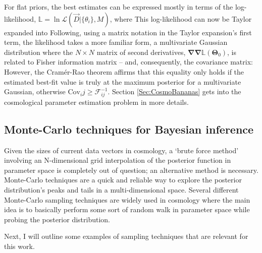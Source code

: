 \qquad For flat priors, the best estimates can be expressed mostly in terms of the log-likelihood, $\mathbb{L} = \ln \mathcal{L}(\vec{D}|\{\theta_i\},M)$, where 
This log-likelihood can now be Taylor expanded into
Following, using a matrix notation in the Taylor expansion's first term, the likelihood takes a more familiar form,
a multivariate Gaussian distribution where the $N\times N$ matrix of second derivatives, $\bm{\nabla\nabla}\mathbb{L}(\mathbf{\Theta}_0)$, is related to Fisher information matrix -- and, consequently, the covariance matrix:
However, the Cram\'er-Rao theorem affirms that this equality only holds if the estimated best-fit value is truly at the maximum posterior for a multivariate Gaussian, otherwise $\text{Cov}_ij \geq \mathcal{F}^{-1}_{ij}$. Section \ref{Sec:CosmoBananas} gets into the cosmological parameter estimation problem in more details.

\subsection{Monte-Carlo techniques for Bayesian inference}\label{Sec:Sampling}
Given the sizes of current data vectors in cosmology, a `brute force method' involving an N-dimensional grid interpolation of the posterior function in parameter space is completely out of question; an alternative method is necessary. Monte-Carlo techniques are a quick and reliable way to explore the posterior distribution's peaks and tails in a multi-dimensional space. Several different Monte-Carlo sampling techniques are widely used in cosmology where the main idea is to basically perform some sort of random walk in parameter space while probing the posterior distribution. 

\qquad Next, I will outline some examples of sampling techniques that are relevant for this work.

